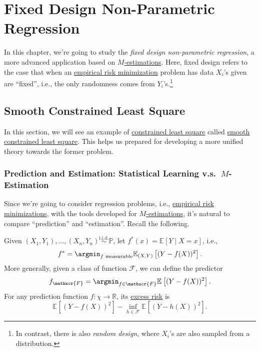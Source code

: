 
\chapter{Fixed Design Non-Parametric Regression}
In this chapter, we're going to study the \emph{fixed design non-parametric regression}, a more advanced application based on \hyperref[prb:M-estimation]{\(M\)-estimations}. Here, fixed design refers to the case that when an \hyperref[prb:ERM]{empirical risk minimization} problem has data \(X_i\)'s given are ``fixed'', i.e., the only randomness comes from \(Y_i\)'s.\footnote{In contrast, there is also \emph{random design}, where \(X_i\)'s are also sampled from a distribution.}

\section{Smooth Constrained Least Square}
In this section, we will see an example of \hyperref[prb:constrained-LS]{constrained least square} called \hyperref[prb:smooth-LS]{smooth constrained least square}. This helps us prepared for developing  a more unified theory towards the former problem.

\subsection{Prediction and Estimation: Statistical Learning v.s.\ \(M\)-Estimation}
Since we're going to consider regression problems, i.e., \hyperref[prb:ERM]{empirical risk minimizations}, with the tools developed for \hyperref[prb:M-estimation]{\(M\)-estimations}, it's natural to compare ``prediction'' and ``estimation''. Recall the following.

\begin{prev}[Prediction]
	Given \((X_1, Y_1), \dots , (X_n, Y_n) \overset{\text{i.i.d.} }{\sim } \mathbb{P} \), let \(f^{\ast} (x) = \mathbb{E}_{}\left[Y \mid X = x \right] \), i.e.,
	\[
		f^{\ast} = \argmin_{f \text{ measurable} } \mathbb{E}_{(X, Y)}\left[ ( Y - f(X) ) ^2 \right] .
	\]
	More generally, given a class of function \(\mathscr{F} \), we can define the predictor
	\[
		f_{\mathscr{F} } = \argmin_{f\in \mathscr{F} } \mathbb{E}_{}\left[ ( Y - f(X) ) ^2 \right] .
	\]
	For any prediction function \(f\colon \chi \to \mathbb{R} \), its \hyperref[def:excess-risk]{excess risk} is
	\[
		\mathbb{E}_{}\left[ ( Y - f(X) ) ^2 \right] - \inf _{h \in \mathscr{F} } \mathbb{E}_{}\left[( Y - h(X) ) ^2 \right] .
	\]
\end{prev}

